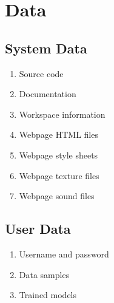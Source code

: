 \section{Data}
\subsection{System Data}
\begin{enumerate}[{label = \textbf{/D{\protect\twodigits{\arabic{enumi}}}0/}, leftmargin = *}]
    \item Source code   %
    \item Documentation %
    \item Workspace information
    \item Webpage HTML files
    \item Webpage style sheets
    \item Webpage texture files
    \item Webpage sound files
\end{enumerate}
\subsection{User Data}
\begin{enumerate}[resume*]
    \item Username and password
    \item Data samples
    \item Trained models
\end{enumerate}

